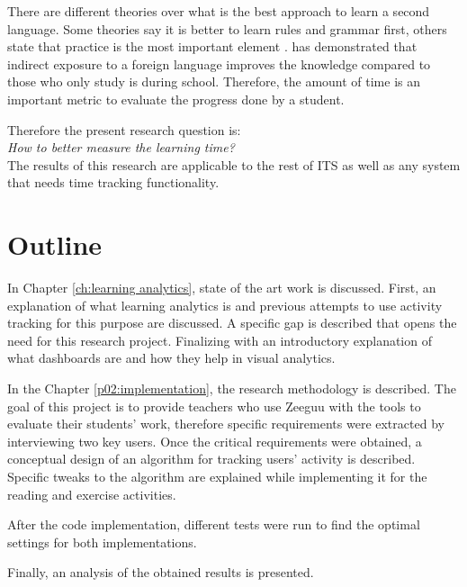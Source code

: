 There are different theories over what is the best approach to learn a second language. Some theories say it is better to learn rules and grammar first, others state that practice is the most important element \cite{Ellis1993}. \citeauthor{Kuppens2010} has demonstrated that indirect exposure to a foreign language improves the knowledge compared to those who only study is during school. Therefore, the amount of time is an important metric to evaluate the progress done by a student.

Therefore the present research question is: \\

\emph{How to better measure the learning time?}\\

The results of this research are applicable to the rest of ITS as well as any system that needs time tracking functionality.

\section{Outline}

In Chapter \ref{ch:learning analytics}, state of the art work is discussed. First, an explanation of what learning analytics is and previous attempts to use activity tracking for this purpose are discussed. A specific gap is described that opens the need for this research project. Finalizing with an introductory explanation of what dashboards are and how they help in visual analytics.

In the Chapter \ref{p02:implementation}, the research methodology is described. The goal of this project is to provide teachers who use Zeeguu with the tools to evaluate their students' work, therefore specific requirements were extracted by interviewing two key users. Once the critical requirements were obtained, a conceptual design of an algorithm for tracking users' activity is described. Specific tweaks to the algorithm are explained while implementing it for the reading and exercise activities.

After the code implementation, different tests were run to find the optimal settings for both implementations.

Finally, an analysis of the obtained results is presented.


